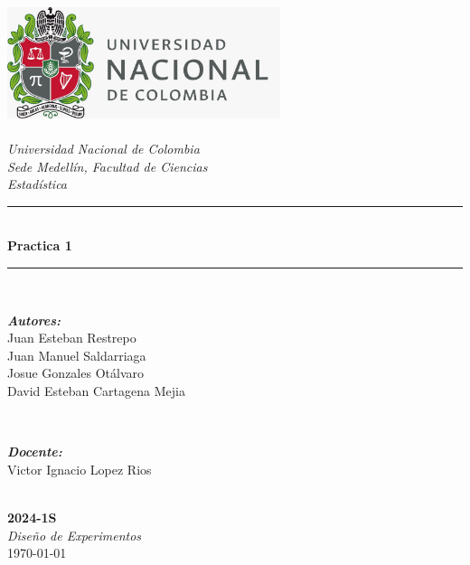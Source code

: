 \begin{titlepage}
\newcommand{\HRule}{\rule{\linewidth}{0.5mm}}
\includegraphics[width=8cm]{Unal.jpeg}\\[0.5cm] 
\center 
\quad\\[1.0cm]
\textsl{\Large Universidad Nacional de Colombia}\\[0.5cm] 
\textsl{\large Sede Medellín, Facultad de Ciencias}\\[0.5cm] 
\textsl{\large Estadística}\\[1.5cm] 
\makeatletter
\HRule \\[0.6cm]
{ \huge \bfseries Practica 1}\\[0.4cm] 
\HRule \\[1.4cm]
\begin{minipage}{0.4\textwidth}
\begin{flushleft} \large
\emph{\textbf{Autores:}}\\
Juan Esteban Restrepo \\
Juan Manuel Saldarriaga\\
Josue Gonzales Otálvaro\\
David Esteban Cartagena Mejia\\
\end{flushleft}
\end{minipage}
~
\begin{minipage}{0.4\textwidth}
\begin{flushright} \large
\emph{\textbf{Docente:}} \\
\textup{Victor Ignacio Lopez Rios}
\end{flushright}
\end{minipage}\\[3.2cm]
\makeatother
{\large \textbf{2024-1S}}\\[0.5cm]
{\large \emph{Diseño de Experimentos}}\\[0.6cm]
{\large \today}\\[2cm] 
\vfill 
\end{titlepage}
